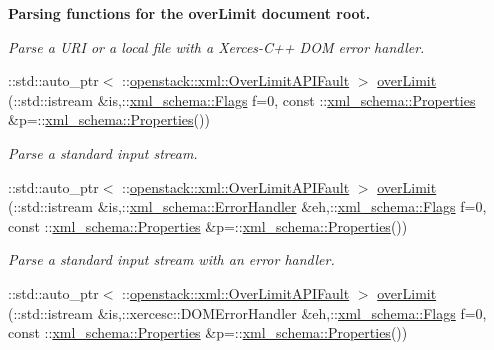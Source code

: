 \begin{Indent}{\bf Parsing functions for the overLimit document root.}
\begin{DoxyCompactItemize}
\begin{DoxyCompactList}\small\item\em Parse a URI or a local file with a Xerces-\/C++ DOM error handler. \item\end{DoxyCompactList}\item 
::std::auto\_\-ptr$<$ ::\hyperlink{classopenstack_1_1xml_1_1OverLimitAPIFault}{openstack::xml::OverLimitAPIFault} $>$ \hyperlink{namespaceopenstack_1_1xml_ac5887e5c562683ba21fd004aec5f03d5}{overLimit} (::std::istream \&is,::\hyperlink{namespacexml__schema_affb4c227cbd9aa7453dd1dc5a1401943}{xml\_\-schema::Flags} f=0, const ::\hyperlink{namespacexml__schema_ad27ce19a7ee1d3b1064092648898f64c}{xml\_\-schema::Properties} \&p=::\hyperlink{namespacexml__schema_ad27ce19a7ee1d3b1064092648898f64c}{xml\_\-schema::Properties}())
\begin{DoxyCompactList}\small\item\em Parse a standard input stream. \item\end{DoxyCompactList}\item 
::std::auto\_\-ptr$<$ ::\hyperlink{classopenstack_1_1xml_1_1OverLimitAPIFault}{openstack::xml::OverLimitAPIFault} $>$ \hyperlink{namespaceopenstack_1_1xml_a82809bc6c6cccd3122a4ed9727552db9}{overLimit} (::std::istream \&is,::\hyperlink{namespacexml__schema_ab1c9361bfd3b404eaabf0c31eded79dc}{xml\_\-schema::ErrorHandler} \&eh,::\hyperlink{namespacexml__schema_affb4c227cbd9aa7453dd1dc5a1401943}{xml\_\-schema::Flags} f=0, const ::\hyperlink{namespacexml__schema_ad27ce19a7ee1d3b1064092648898f64c}{xml\_\-schema::Properties} \&p=::\hyperlink{namespacexml__schema_ad27ce19a7ee1d3b1064092648898f64c}{xml\_\-schema::Properties}())
\begin{DoxyCompactList}\small\item\em Parse a standard input stream with an error handler. \item\end{DoxyCompactList}\item 
::std::auto\_\-ptr$<$ ::\hyperlink{classopenstack_1_1xml_1_1OverLimitAPIFault}{openstack::xml::OverLimitAPIFault} $>$ \hyperlink{namespaceopenstack_1_1xml_aeec68364b721f58a2a3ef81bdaf73cb8}{overLimit} (::std::istream \&is,::xercesc::DOMErrorHandler \&eh,::\hyperlink{namespacexml__schema_affb4c227cbd9aa7453dd1dc5a1401943}{xml\_\-schema::Flags} f=0, const ::\hyperlink{namespacexml__schema_ad27ce19a7ee1d3b1064092648898f64c}{xml\_\-schema::Properties} \&p=::\hyperlink{namespacexml__schema_ad27ce19a7ee1d3b1064092648898f64c}{xml\_\-schema::Properties}())

\end{DoxyCompactItemize}
\end{Indent}
